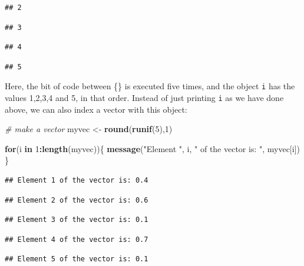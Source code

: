 \documentclass[]{book}
\newenvironment{Shaded}{\begin{snugshade}}{\end{snugshade}}
\newcommand{\CommentTok}[1]{\textcolor[rgb]{0.56,0.35,0.01}{\textit{#1}}}
\newcommand{\ControlFlowTok}[1]{\textcolor[rgb]{0.13,0.29,0.53}{\textbf{#1}}}
\newcommand{\DecValTok}[1]{\textcolor[rgb]{0.00,0.00,0.81}{#1}}
\newcommand{\KeywordTok}[1]{\textcolor[rgb]{0.13,0.29,0.53}{\textbf{#1}}}
\newcommand{\NormalTok}[1]{#1}
\newcommand{\OperatorTok}[1]{\textcolor[rgb]{0.81,0.36,0.00}{\textbf{#1}}}
\newcommand{\StringTok}[1]{\textcolor[rgb]{0.31,0.60,0.02}{#1}}
\begin{document}
\begin{verbatim}
## 2
\end{verbatim}

\begin{verbatim}
## 3
\end{verbatim}

\begin{verbatim}
## 4
\end{verbatim}

\begin{verbatim}
## 5
\end{verbatim}

Here, the bit of code between \{\} is executed five times, and the object \texttt{i} has the values 1,2,3,4 and 5, in that order. Instead of just printing \texttt{i} as we have done above, we can also index a vector with this object:

\begin{Shaded}
\begin{Highlighting}[]
\CommentTok{# make a vector}
\NormalTok{myvec <-}\StringTok{ }\KeywordTok{round}\NormalTok{(}\KeywordTok{runif}\NormalTok{(}\DecValTok{5}\NormalTok{),}\DecValTok{1}\NormalTok{)}

\ControlFlowTok{for}\NormalTok{(i }\ControlFlowTok{in} \DecValTok{1}\OperatorTok{:}\KeywordTok{length}\NormalTok{(myvec))\{}
  \KeywordTok{message}\NormalTok{(}\StringTok{"Element "}\NormalTok{, i, }\StringTok{" of the vector is: "}\NormalTok{, myvec[i])}
\NormalTok{\}}
\end{Highlighting}
\end{Shaded}

\begin{verbatim}
## Element 1 of the vector is: 0.4
\end{verbatim}

\begin{verbatim}
## Element 2 of the vector is: 0.6
\end{verbatim}

\begin{verbatim}
## Element 3 of the vector is: 0.1
\end{verbatim}

\begin{verbatim}
## Element 4 of the vector is: 0.7
\end{verbatim}

\begin{verbatim}
## Element 5 of the vector is: 0.1
\end{verbatim}
\end{document}
